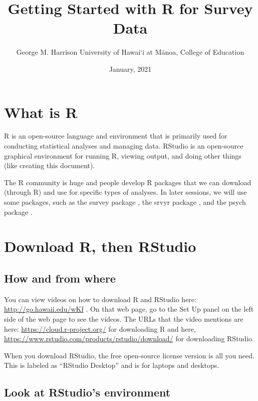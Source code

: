 \documentclass[
]{article}
\title{Getting Started with R for Survey Data}
\author{George M. Harrison University of Hawai`i at Mānoa, College of Education}
\date{January, 2021}
\begin{document}
\maketitle

{
\setcounter{tocdepth}{2}
\tableofcontents
}
\hypertarget{what-is-r}{%
\section{What is R}\label{what-is-r}}

R \citep{R-base} is an open-source language and environment that is primarily used for conducting statistical analyses and managing data. RStudio \citep{RStudio} is an open-source graphical environment for running R, viewing output, and doing other things (like creating this document).

The R community is huge and people develop R packages that we can download (through R) and use for specific types of analyses. In later sessions, we will use some packages, such as the survey package \citep{R-survey}, the srvyr package \citep{R-srvyr}, and the psych package \citep{R-psych}.

\hypertarget{download}{%
\section{Download R, then RStudio}\label{download}}

\hypertarget{how-and-from-where}{%
\subsection{How and from where}\label{how-and-from-where}}

You can view videos on how to download R and RStudio here: \url{http://go.hawaii.edu/wKf} . On that web page, go to the Set Up panel on the left side of the web page to see the videos. The URLs that the video mentions are here: \url{https://cloud.r-project.org/} for downloading R and here, \url{https://www.rstudio.com/products/rstudio/download/} for downloading RStudio.

When you download RStudio, the free open-source license version is all you need. This is labeled as ``RStudio Desktop'' and is for laptops and desktops.

\hypertarget{look-at-rstudios-environment}{%
\subsection{Look at RStudio's environment}\label{look-at-rstudios-environment}}
\end{document}
